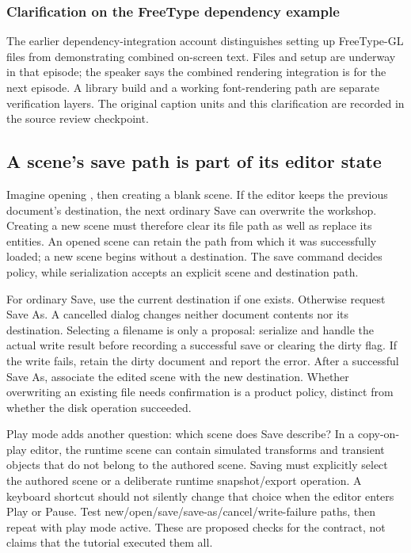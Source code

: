 \subsubsection{Clarification on the FreeType dependency example}\label{06-engine-ii-ch046-clarification-on-the-freetype-dependency-example}

\hypertarget{06-engine-ii-ch046-clarification-on-the-freetype-dependency-example}{}

The earlier dependency-integration account distinguishes setting up FreeType-GL files from demonstrating combined on-screen text. Files and setup are underway in that episode; the speaker says the combined rendering integration is for the next episode. A library build and a working font-rendering path are separate verification layers. The original caption units and this clarification are recorded in the source review checkpoint.

\subsection{A scene's save path is part of its editor state}\label{06-engine-ii-ch046-a-scenes-save-path-is-part-of-its-editor-state}

\hypertarget{06-engine-ii-ch046-a-scenes-save-path-is-part-of-its-editor-state}{}

Imagine opening , then creating a blank scene. If the editor keeps the previous document's destination, the next ordinary Save can overwrite the workshop. Creating a new scene must therefore clear its file path as well as replace its entities. An opened scene can retain the path from which it was successfully loaded; a new scene begins without a destination. The save command decides policy, while serialization accepts an explicit scene and destination path.

For ordinary Save, use the current destination if one exists. Otherwise request Save As. A cancelled dialog changes neither document contents nor its destination. Selecting a filename is only a proposal: serialize and handle the actual write result before recording a successful save or clearing the dirty flag. If the write fails, retain the dirty document and report the error. After a successful Save As, associate the edited scene with the new destination. Whether overwriting an existing file needs confirmation is a product policy, distinct from whether the disk operation succeeded.

Play mode adds another question: which scene does Save describe? In a copy-on-play editor, the runtime scene can contain simulated transforms and transient objects that do not belong to the authored scene. Saving must explicitly select the authored scene or a deliberate runtime snapshot/export operation. A keyboard shortcut should not silently change that choice when the editor enters Play or Pause. Test new/open/save/save-as/cancel/write-failure paths, then repeat with play mode active. These are proposed checks for the contract, not claims that the tutorial executed them all.

